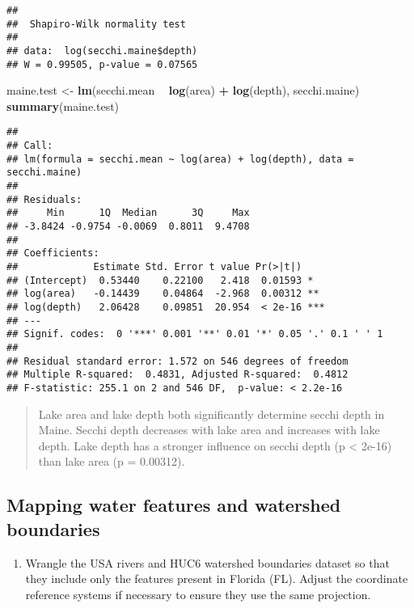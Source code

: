 \documentclass[]{article}
\newenvironment{Shaded}{\begin{snugshade}}{\end{snugshade}}
\newcommand{\KeywordTok}[1]{\textcolor[rgb]{0.13,0.29,0.53}{\textbf{#1}}}
\newcommand{\NormalTok}[1]{#1}
\newcommand{\OperatorTok}[1]{\textcolor[rgb]{0.81,0.36,0.00}{\textbf{#1}}}
\newcommand{\StringTok}[1]{\textcolor[rgb]{0.31,0.60,0.02}{#1}}
\providecommand{\tightlist}{%
  \setlength{\itemsep}{0pt}\setlength{\parskip}{0pt}}
\begin{document}
\begin{verbatim}
## 
##  Shapiro-Wilk normality test
## 
## data:  log(secchi.maine$depth)
## W = 0.99505, p-value = 0.07565
\end{verbatim}

\begin{Shaded}
\begin{Highlighting}[]
\NormalTok{maine.test <-}\StringTok{ }\KeywordTok{lm}\NormalTok{(secchi.mean }\OperatorTok{~}\StringTok{ }\KeywordTok{log}\NormalTok{(area) }\OperatorTok{+}\StringTok{ }\KeywordTok{log}\NormalTok{(depth), secchi.maine)}
\KeywordTok{summary}\NormalTok{(maine.test)}
\end{Highlighting}
\end{Shaded}

\begin{verbatim}
## 
## Call:
## lm(formula = secchi.mean ~ log(area) + log(depth), data = secchi.maine)
## 
## Residuals:
##     Min      1Q  Median      3Q     Max 
## -3.8424 -0.9754 -0.0069  0.8011  9.4708 
## 
## Coefficients:
##             Estimate Std. Error t value Pr(>|t|)    
## (Intercept)  0.53440    0.22100   2.418  0.01593 *  
## log(area)   -0.14439    0.04864  -2.968  0.00312 ** 
## log(depth)   2.06428    0.09851  20.954  < 2e-16 ***
## ---
## Signif. codes:  0 '***' 0.001 '**' 0.01 '*' 0.05 '.' 0.1 ' ' 1
## 
## Residual standard error: 1.572 on 546 degrees of freedom
## Multiple R-squared:  0.4831, Adjusted R-squared:  0.4812 
## F-statistic: 255.1 on 2 and 546 DF,  p-value: < 2.2e-16
\end{verbatim}

\begin{quote}
Lake area and lake depth both significantly determine secchi depth in
Maine. Secchi depth decreases with lake area and increases with lake
depth. Lake depth has a stronger influence on secchi depth (p
\textless{} 2e-16) than lake area (p = 0.00312).
\end{quote}

\hypertarget{mapping-water-features-and-watershed-boundaries}{%
\subsection{Mapping water features and watershed
boundaries}\label{mapping-water-features-and-watershed-boundaries}}

\begin{enumerate}
\def\labelenumi{\arabic{enumi}.}
\setcounter{enumi}{9}
\tightlist
\item
  Wrangle the USA rivers and HUC6 watershed boundaries dataset so that
  they include only the features present in Florida (FL). Adjust the
  coordinate reference systems if necessary to ensure they use the same
  projection.
\end{enumerate}
\end{document}
